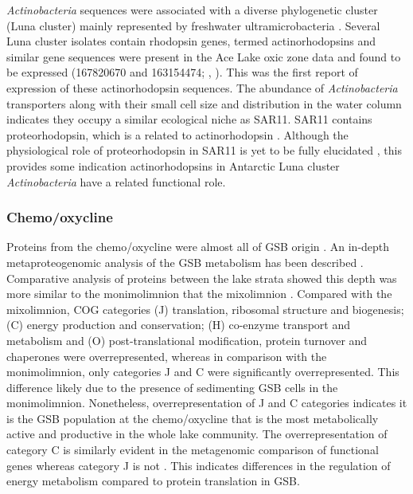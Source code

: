 \emph{Actinobacteria} sequences were associated with a diverse phylogenetic cluster (Luna cluster) mainly represented by freshwater ultramicrobacteria \cite{Hahn2003}. 
Several Luna cluster isolates contain rhodopsin genes, termed actinorhodopsins \cite{Sharma2009} and similar gene sequences were present in the Ace Lake oxic zone data and found to be expressed (167820670 and 163154474; , ).
This was the first report of expression of these actinorhodopsin sequences.
The abundance of \emph{Actinobacteria} transporters along with their small cell size and distribution in the water column indicates they occupy a similar ecological niche as SAR11.
SAR11 contains proteorhodopsin, which is a related to actinorhodopsin \cite{Sharma2009}.
Although the physiological role of proteorhodopsin in SAR11 is yet to be fully elucidated \cite{Fuhrman2008}, this provides some indication actinorhodopsins in Antarctic Luna cluster \emph{Actinobacteria} have a related functional role.

\subsubsection{Chemo/oxycline}
Proteins from the chemo/oxycline were almost all of \ac{GSB} origin . 
An in-depth metaproteogenomic analysis of the \ac{GSB} metabolism has been described \cite{Ng2010a, Ng2010b}.
Comparative analysis of proteins between the lake strata showed this depth was more similar to the monimolimnion that the mixolimnion .
Compared with the mixolimnion, \ac{COG} categories (J) translation, ribosomal structure and biogenesis; (C) energy production and conservation; (H) co-enzyme transport and metabolism and (O) post-translational modification, protein turnover and chaperones were overrepresented, whereas in comparison with the monimolimnion, only categories J and C were significantly overrepresented.
This difference likely due to the presence of sedimenting \ac{GSB} cells in the monimolimnion.
Nonetheless, overrepresentation of J and C categories indicates it is the \ac{GSB} population at the chemo/oxycline that is the most metabolically active and productive in the whole lake community.
The overrepresentation of category C is similarly evident in the metagenomic comparison of functional genes whereas category J is not \cite{Lauro2011}.
This indicates differences in the regulation of energy metabolism compared to protein translation in \ac{GSB}.

